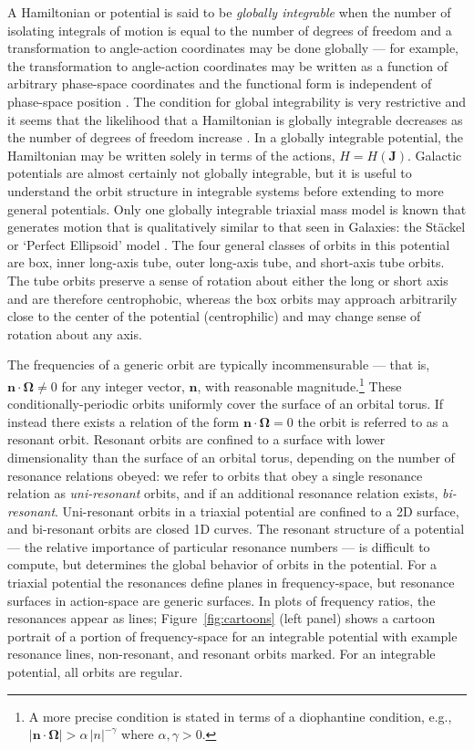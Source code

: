 \documentclass[letterpaper,12pt,preprint]{aastex}
\newcommand{\bs}[1]{\boldsymbol{#1}}
\begin{document}
A Hamiltonian or potential is said to be \emph{globally integrable} when the number of isolating integrals of motion is equal to the number of degrees of freedom and a transformation to angle-action coordinates may be done globally --- for example, the transformation to angle-action coordinates may be written as a function of arbitrary phase-space coordinates and the functional form is independent of phase-space position \citep[e.g.,][]{goldstein80}. The condition for global integrability is very restrictive and it seems that the likelihood that a Hamiltonian is globally integrable decreases as the number of degrees of freedom increase \citep[e.g.,][]{lichtenberg83}. In a globally integrable potential, the Hamiltonian may be written solely in terms of the actions, $H = H(\boldsymbol{J})$. Galactic potentials are almost certainly not globally integrable, but it is useful to understand the orbit structure in integrable systems before extending to more general potentials. Only one globally integrable triaxial mass model is known that generates motion that is qualitatively similar to that seen in Galaxies: the St\"ackel or `Perfect Ellipsoid' model \citep[e.g.,][]{kuzmin73, deZeeuw85}. The four general classes of orbits in this potential are box, inner long-axis tube, outer long-axis tube, and short-axis tube orbits. The tube orbits preserve a sense of rotation about either the long or short axis and are therefore centrophobic, whereas the box orbits may approach arbitrarily close to the center of the potential (centrophilic) and may change sense of rotation about any axis.

The frequencies of a generic orbit are typically incommensurable --- that is, $\bs{n} \cdot \bs{\Omega} \neq 0$ for any integer vector, $\bs{n}$, with reasonable magnitude.\footnote{A more precise condition is stated in terms of a diophantine condition, e.g., $|\bs{n} \cdot \boldsymbol{\Omega}| > \alpha \, |n|^{-\gamma}$ where $\alpha, \gamma>0$.} These conditionally-periodic orbits uniformly cover the surface of an orbital torus. If instead there exists a relation of the form $\boldsymbol{n} \cdot \boldsymbol{\Omega} = 0$ the orbit is referred to as a resonant orbit. Resonant orbits are confined to a surface with lower dimensionality than the surface of an orbital torus, depending on the number of resonance relations obeyed: we refer to orbits that obey a single resonance relation as \emph{uni-resonant} orbits, and if an additional resonance relation exists, \emph{bi-resonant}. Uni-resonant orbits in a triaxial potential are confined to a 2D surface, and bi-resonant orbits are closed 1D curves. The resonant structure of a potential --- the relative importance of particular resonance numbers --- is difficult to compute, but determines the global behavior of orbits in the potential. For a triaxial potential the resonances define planes in frequency-space, but resonance surfaces in action-space are generic surfaces. In plots of frequency ratios, the resonances appear as lines; Figure~\ref{fig:cartoons} (left panel) shows a cartoon portrait of a portion of frequency-space for an integrable potential with example resonance lines, non-resonant, and resonant orbits marked. For an integrable potential, all orbits are regular.
\end{document}
